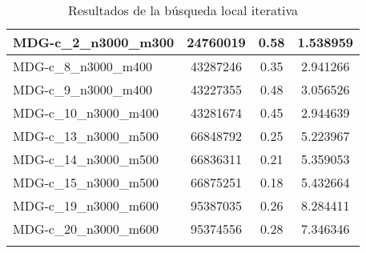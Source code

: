 \documentclass[11pt,a4paper]{article}
\begin{document}
\begin{table}[H]
\begin{center}
\begin{tabular}{|l|c|c|c|}
					MDG-c\_2\_n3000\_m300 & 24760019 & 0.58 & 1.538959 \\ \hline
					MDG-c\_8\_n3000\_m400 & 43287246 & 0.35 & 2.941266 \\ \hline
					MDG-c\_9\_n3000\_m400 & 43227355 & 0.48 & 3.056526 \\ \hline
					MDG-c\_10\_n3000\_m400 & 43281674 & 0.45 & 2.944639 \\ \hline
					MDG-c\_13\_n3000\_m500 & 66848792 & 0.25 & 5.223967 \\ \hline
					MDG-c\_14\_n3000\_m500 & 66836311 & 0.21 & 5.359053 \\ \hline
					MDG-c\_15\_n3000\_m500 & 66875251 & 0.18 & 5.432664 \\ \hline
					MDG-c\_19\_n3000\_m600 & 95387035 & 0.26 & 8.284411 \\ \hline
					MDG-c\_20\_n3000\_m600 & 95374556 & 0.28 & 7.346346 \\ \hline
					& \multicolumn{1}{l|}{} & \multicolumn{1}{l|}{} & \multicolumn{1}{l|}{} \\ \hline
				\end{tabular}
					\end{center}
				\caption{Resultados de la búsqueda local iterativa}
				\label{}

			\end{table}
			
\end{document}
